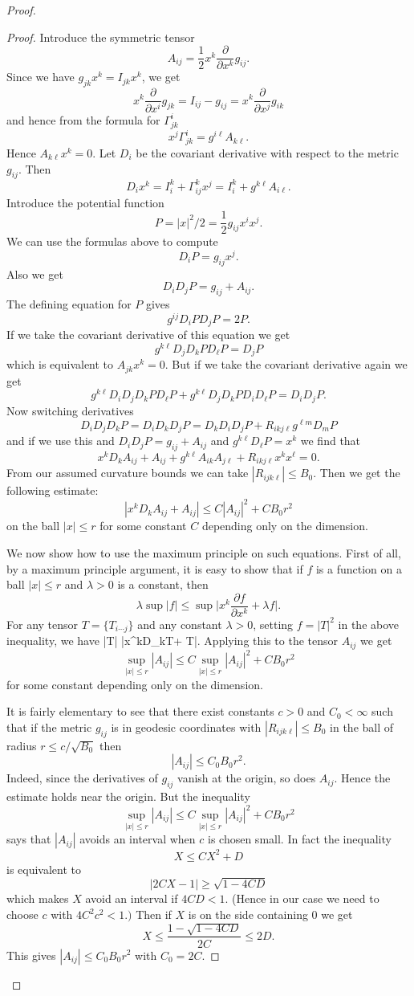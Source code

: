 \begin{proof}
\begin{proof}
Introduce the symmetric tensor
$$
A_{ij} = \frac{1}{2} x^k \frac{\partial}{\partial x^k} g_{ij}.
$$
Since we have $g_{jk}x^k=I_{jk}x^k$, we get
$$
x^k \frac{\partial}{\partial x^i}g_{jk} = I_{ij}-g_{ij}=x^k
\frac{\partial}{\partial x^j}g_{ik}
$$
and hence from the formula for $\Gamma^i_{jk}$
$$
x^j \Gamma^i_{jk}=g^{i \ell}A_{k \ell}.
$$
Hence $A_{k \ell}x^k=0$. Let $D_i$ be the covariant derivative
with respect to the metric $g_{ij}$. Then
$$
D_ix^k=I^k_i+ \Gamma^k_{ij}x^j=I^k_i+g^{k \ell}A_{i \ell}.
$$
Introduce the potential function
$$
P=|x|^2/2 = \frac{1}{2}g_{ij}x^ix^j.
$$
We can use the formulas above to compute
$$
D_iP=g_{ij}x^j.
$$
Also we get
$$
D_iD_jP=g_{ij}+A_{ij}.
$$
The defining equation for $P$ gives
$$
g^{ij}D_iPD_jP=2P.
$$
If we take the covariant derivative of this equation we get
$$
g^{k \ell}D_jD_kPD_{\ell}P=D_jP
$$
which is equivalent to $A_{jk}x^k=0$. But if we take the covariant
derivative again we get
$$
g^{k \ell}D_iD_jD_kPD_\ell P + g^{k \ell}D_jD_kPD_iD_\ell P = D_i
D_j P.
$$
Now switching derivatives
$$
D_iD_jD_kP=D_iD_kD_jP=D_kD_iD_jP+R_{ikj \ell}g^{\ell m}D_mP
$$
and if we use this and $D_iD_jP=g_{ij}+A_{ij}$ and $g^{k
\ell}D_{\ell}P=x^k$ we find that
$$
x^kD_kA_{ij}+A_{ij}+g^{k \ell} A_{ik}A_{j \ell} + R_{ikj \ell}x^k
x^\ell=0.
$$
{}From our assumed curvature bounds we can take $|R_{ijk \ell}|
\leq B_0$. Then we get the following estimate:
$$
|x^kD_kA_{ij}+A_{ij}| \leq C|A_{ij}|^2+CB_0 r^2
$$
on the ball $|x| \leq r$ for some constant $C$ depending only on
the dimension.

We now show how to use the maximum principle on such equations.
First of all, by a maximum principle argument, it is easy to show
that if $f$ is a function on a ball $|x| \leq r$ and $\lambda>0$
is a constant, then
$$
\lambda \operatorname{sup}|f| \leq \operatorname{sup} \Big| x^k
\frac{\partial f}{\partial x^k} + \lambda f \Big|.
$$
For any tensor $T=\{T_{i \cdots j}\}$ and any constant $\lambda
>0$, setting $f=|T|^2$ in the above inequality, we have \be
\lambda \sup|T| \leq \sup|x^kD_kT+
\lambda T|. %
\ee Applying this to the tensor $A_{ij}$ we get
\[
\sup_{|x| \leq r} |A_{ij}| \leq C \sup_{|x| \leq r}
|A_{ij}|^2+CB_0r^2
\]
for some constant depending only on the dimension.

It is fairly elementary to see that there exist constants $c>0$
and $C_0 < \infty$ such that if the metric $g_{ij}$ is in geodesic
coordinates with $|R_{ijk \ell}| \leq B_0$ in the ball of radius
$r \leq c /\sqrt{B_0}$ then
$$
|A_{ij}| \leq C_0 B_0r^2.
$$
Indeed, since the derivatives of $g_{ij}$ vanish at the origin, so
does $A_{ij}$. Hence the estimate holds near the origin. But the
inequality
$$
\sup_{|x| \leq r} |A_{ij}| \leq C \sup_{|x| \leq r}
|A_{ij}|^2+CB_0r^2
$$
says that $|A_{ij}|$ avoids an interval when $c$ is chosen small.
In fact the inequality
$$
X \leq CX^2+D
$$
is equivalent to
$$
|2CX-1| \geq \sqrt{1-4CD}
$$
which makes $X$ avoid an interval if $4CD<1$. (Hence in our case
we need to choose $c$ with $4C^2c^2<1.)$ Then if $X$ is on the
side containing $0$ we get
$$
X \leq \frac{1- \sqrt{1 - 4CD}}{2C} \leq 2D.
$$
This gives $|A_{ij}| \leq C_0B_0r^2$ with $C_0=2C$.


\end{proof}
\end{proof}
